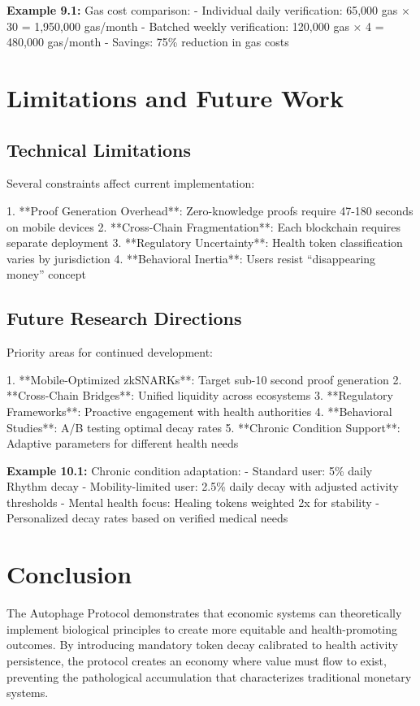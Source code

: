 \documentclass[11pt,letterpaper]{article}
\begin{document}
\textbf{Example 9.1:} Gas cost comparison:
- Individual daily verification: 65,000 gas × 30 = 1,950,000 gas/month
- Batched weekly verification: 120,000 gas × 4 = 480,000 gas/month
- Savings: 75\% reduction in gas costs

\section{Limitations and Future Work}

\subsection{Technical Limitations}

Several constraints affect current implementation:

1. **Proof Generation Overhead**: Zero-knowledge proofs require 47-180 seconds on mobile devices
2. **Cross-Chain Fragmentation**: Each blockchain requires separate deployment
3. **Regulatory Uncertainty**: Health token classification varies by jurisdiction
4. **Behavioral Inertia**: Users resist ``disappearing money'' concept

\subsection{Future Research Directions}

Priority areas for continued development:

1. **Mobile-Optimized zkSNARKs**: Target sub-10 second proof generation
2. **Cross-Chain Bridges**: Unified liquidity across ecosystems
3. **Regulatory Frameworks**: Proactive engagement with health authorities
4. **Behavioral Studies**: A/B testing optimal decay rates
5. **Chronic Condition Support**: Adaptive parameters for different health needs

\textbf{Example 10.1:} Chronic condition adaptation:
- Standard user: 5\% daily Rhythm decay
- Mobility-limited user: 2.5\% daily decay with adjusted activity thresholds
- Mental health focus: Healing tokens weighted 2x for stability
- Personalized decay rates based on verified medical needs

\section{Conclusion}

The Autophage Protocol demonstrates that economic systems can theoretically implement biological principles to create more equitable and health-promoting outcomes. By introducing mandatory token decay calibrated to health activity persistence, the protocol creates an economy where value must flow to exist, preventing the pathological accumulation that characterizes traditional monetary systems.
\end{document}
